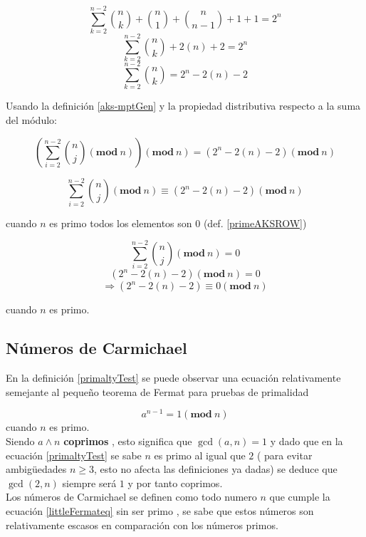 \documentclass[a4paper, 12pt]{article}
\begin{document}
	\[\sum_{k=2}^{n-2}\binom{n}{k} + \binom{n}{1} + \binom{n}{n-1} + 1 + 1  = 2^{n}\]
	\[\sum_{k=2}^{n-2}\binom{n}{k} + 2(n) + 2  = 2^{n}\]
	\begin{equation}\label{mptSum}
			 \sum_{k=2}^{n-2}\binom{n}{k} = 2^{n} -2 (n) - 2
	\end{equation}

Usando la definición \ref{aks-mptGen} y la propiedad distributiva respecto a la suma del módulo:
	
	\[ 	(\sum_{i = 2}^{n-2}\binom{n}{j}(\mathbf{mod}\ n))(\mathbf{mod}\ n)  = (2^{n} -2(n) - 2)(\mathbf{mod}\ n) \]
	
	\begin{equation}\label{sumAKSMPT}
		\sum_{i = 2}^{n-2}\binom{n}{j}(\mathbf{mod}\ n) \equiv (2^{n} -2(n) - 2)(\mathbf{mod}\ n)
	\end{equation}

cuando $n$ es primo todos los elementos son 0 (def. \ref{primeAKSROW})
	
	\[ \sum_{i = 2}^{n-2}\binom{n}{j}(\mathbf{mod}\ n) = 0 \]
	\[ (2^{n} -2(n) - 2)(\mathbf{mod}\ n) = 0 \]
	\begin{equation}\label{primaltyTest}
	\Rightarrow  (2^{n} -2(n) - 2) \equiv 0 (\mathbf{mod}\ n)
	\end{equation}
	
cuando $n$ es primo.

\subsection{Números de Carmichael}

En la definición \ref{primaltyTest} se puede observar una ecuación relativamente semejante al pequeño teorema de Fermat para pruebas de primalidad \citep[pag. 97]{littleFermatBook}

 \begin{equation}\label{littleFermateq}
 a^{n-1} = 1 (\mathbf{mod}\ n)
 \end{equation}
cuando $n$ es primo.
\ \\
Siendo $a \land n$ \textbf{coprimos} , esto significa que $\gcd(a,n) = 1$ y dado que en la ecuación \ref{primaltyTest} se sabe $n$ es primo al igual que $2$ ( para evitar ambigüedades $n \geq 3$, esto no afecta las definiciones ya dadas)
se deduce que $\gcd(2,n)$ siempre será $1$ y por tanto coprimos.
\pagebreak
\ \\
Los números de Carmichael se definen como todo numero $n$ que cumple la ecuación \ref{littleFermateq} sin ser primo \citep{carmichaelNum}, se sabe que estos números son relativamente escasos en comparación con los números primos.
\end{document}
